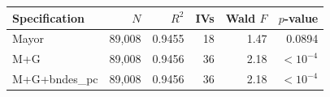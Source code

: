 \begingroup
\centering
\begin{tabular}{lrrrrr}
\toprule
Specification & $N$ & $R^2$ & IVs & Wald $F$ & $p$-value \\
\midrule
Mayor & 89,008 & 0.9455 & 18 & 1.47 & 0.0894 \\
M+G & 89,008 & 0.9456 & 36 & 2.18 & $< 10^{-4}$ \\
M+G+bndes\_pc & 89,008 & 0.9456 & 36 & 2.18 & $< 10^{-4}$ \\
\bottomrule
\end{tabular}
\par\endgroup
